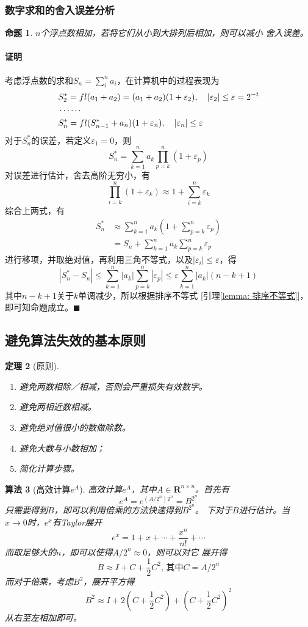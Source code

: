 \documentclass[12pt, a4paper]{article}
\theoremstyle{margin}
\newtheorem{thm}{定理}
\newtheorem{pos}[thm]{命题}
\newtheorem{alg}[thm]{算法}
\newcommand{\fl}{\mathnormal{fl}}
\newcommand{\R}{\mathbf{R}}
\newcommand{\str}{^*}
\newcommand{\vep}{\varepsilon}
\newcommand\lemmaref[1]{引理\ref{#1}}
\newcommand{\proof}{\paragraph{证明}}
\begin{document}
\subsubsection{数字求和的舍入误差分析}
  \begin{pos}
    $n$个浮点数相加，若将它们从小到大排列后相加，则可以减小
    舍入误差。
  \end{pos}
  \proof
    考虑浮点数的求和$S_n=\sum_i^n a_i$，在计算机中的过程表现为
    \[\begin{split}
      & S_2^* = \fl(a_1+a_2)=(a_1+a_2)(1+\vep_2),\quad|\vep_2|\le\vep=2^{-t}\\
      & \cdots\cdots\\
      & S_n^* = \fl(S_{n-1}^*+a_n)(1+\vep_n),\quad|\vep_n|\le\vep
    \end{split}\]
    对于$S_n\str$的误差，若定义$\vep_1=0$，则
    \[
      S_n\str=\sum_{k=1}^n a_k\prod_{p=k}^n(1+\vep_p)
    \]
    对误差进行估计，舍去高阶无穷小，有
    \[
      \prod_{i=k}^n(1+\vep_k)\approx1+\sum_{i=k}^n\vep_k
    \]
    综合上两式，有
    \[\begin{split}
      S_n\str & \approx\sum_{k=1}^na_k(1+\sum_{p=k}^n\vep_p)\\
      & = S_n + \sum_{k=1}^na_k\sum_{p=k}^n\vep_p
    \end{split}\]
    进行移项，并取绝对值，再利用三角不等式，以及$|\vep_i|\le\vep$，得
    \[
      \left|S_n\str-S_n\right|
      \le \sum_{k=1}^n|a_k|\sum_{p=k}^n|\vep_p|
      \le \vep\sum_{k=1}^n|a_k|(n-k+1)
    \]
    其中$n-k+1$关于$k$单调减少，所以根据排序不等式
    [\lemmaref{lemma: 排序不等式}]，即可知命题成立。$\blacksquare$

\newpage
\subsection{避免算法失效的基本原则}
  \begin{thm}[原则]
    $\,$
    \begin{enumerate}
      \item 避免两数相除／相减，否则会严重损失有效数字。
      \item 避免两相近数相减。
      \item 避免绝对值很小的数做除数。
      \item 避免大数与小数相加；
      \item 简化计算步骤。
    \end{enumerate}
  \end{thm}


  \begin{alg}[高效计算$e^A$]
    高效计算$e^A$，其中$A\in\R^{n\times n}$。首先有
    \[
      e^A = e^{(A/2^n)2^n} = B^{2^n}
    \]
    只需要得到$B$，即可以利用倍乘的方法快速得到$B^{2^n}$。
    下对于$B$进行估计。当$x\to0$时，$e^x$有Taylor展开
    \[
      e^x = 1 + x + \cdots + \frac{x^n}{n!} + \cdots
    \]
    而取足够大的$n$，即可以使得$A/2^n\approx0$，则可以对它
    展开得
    \[
      B \approx I + C + \frac{1}{2}C^2,\,\text{其中}
      C = A/2^n
    \]
    而对于倍乘，考虑$B^2$，展开平方得
    \[
      B^2 \approx I + 2(C+\frac{1}{2}C^2) + (C+\frac{1}{2}C^2)^2
    \]
    从右至左相加即可。
  \end{alg}
\end{document}

